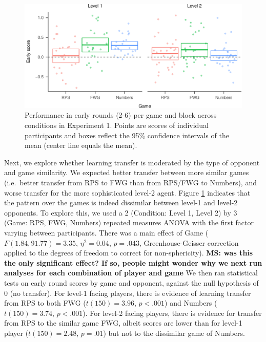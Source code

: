 \documentclass[
  english,
  man,floatsintext]{apa6}
\begin{document}
\begin{figure}

{\centering \includegraphics{paper_draft_2021_files/figure-latex/exp1-early-score-by-opp-1} 

}

\caption{\label{ref:figure4-caption}Performance in early rounds (2-6) per game and block across conditions in Experiment 1. Points are scores of individual participants and boxes reflect the 95\% confidence intervals of the mean (center line equals the mean).}\label{fig:exp1-early-score-by-opp}
\end{figure}

Next, we explore whether learning transfer is moderated by the type of opponent and game similarity. We expected better transfer between more similar games (i.e.~better transfer from RPS to FWG than from RPS/FWG to Numbers), and worse transfer for the more sophisticated level-2 agent. Figure \ref{fig:exp1-early-score-by-opp} indicates that the pattern over the games is indeed dissimilar between level-1 and level-2 opponents. To explore this, we used a 2 (Condition: Level 1, Level 2) by 3 (Game: RPS, FWG, Numbers) repeated measures ANOVA with the first factor varying between participants. There was a main effect of Game (\(F(1.84,91.77) = 3.35\), \(\eta^{2} = 0.04\), \(p = .043\), Greenhouse-Geisser correction applied to the degrees of freedom to correct for non-sphericity). \textbf{MS: was this the only significant effect? If so, people might wonder why we next run analyses for each combination of player and game} We then ran statistical tests on early round scores by game and opponent, against the null hypothesis of 0 (no transfer). For level-1 facing players, there is evidence of learning transfer from RPS to both FWG (\(t(150) = 3.96\), \(p < .001\)) and Numbers (\(t(150) = 3.74\), \(p < .001\)). For level-2 facing players, there is evidence for transfer from RPS to the similar game FWG, albeit scores are lower than for level-1 player (\(t(150) = 2.48\), \(p = .01\)) but not to the dissimilar game of Numbers.
\end{document}
